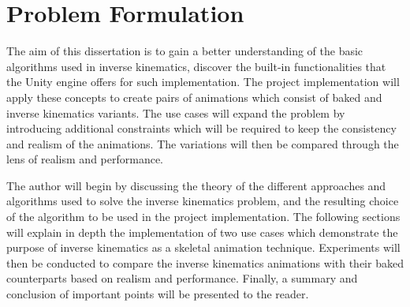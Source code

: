\section{Problem Formulation}

The aim of this dissertation is to gain a better understanding of the basic
algorithms used in inverse kinematics, discover the built-in functionalities
that the Unity engine offers for such implementation. The project implementation
will apply these concepts to create pairs of animations which consist of baked
and inverse kinematics variants. The use cases will expand the problem by
introducing additional constraints which will be required to keep the
consistency and realism of the animations. The variations will then be compared
through the lens of realism and performance.

The author will begin by discussing the theory of the different approaches and
algorithms used to solve the inverse kinematics problem, and the resulting
choice of the algorithm to be used in the project implementation. The following
sections will explain in depth the implementation of two use cases which
demonstrate the purpose of inverse kinematics as a skeletal animation technique.
Experiments will then be conducted to compare the inverse kinematics animations
with their baked counterparts based on realism and performance. Finally,
a summary and conclusion of important points will be presented to the reader.

